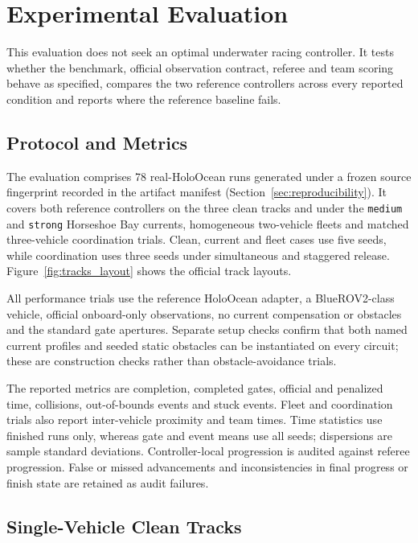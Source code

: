 \section{Experimental Evaluation}
\label{sec:evaluation}

This evaluation does not seek an optimal underwater racing controller. It tests whether the benchmark, official observation contract, referee and team scoring behave as specified, compares the two reference controllers across every reported condition and reports where the reference baseline fails.

\subsection{Protocol and Metrics}

The evaluation comprises 78 real-HoloOcean runs generated under a frozen source fingerprint recorded in the artifact manifest (Section~\ref{sec:reproducibility}). It covers both reference controllers on the three clean tracks and under the \texttt{medium} and \texttt{strong} Horseshoe Bay currents, homogeneous two-vehicle fleets and matched three-vehicle coordination trials. Clean, current and fleet cases use five seeds, while coordination uses three seeds under simultaneous and staggered release. Figure~\ref{fig:tracks_layout} shows the official track layouts.



All performance trials use the reference HoloOcean adapter, a BlueROV2-class vehicle, official onboard-only observations, no current compensation or obstacles and the standard gate apertures. Separate setup checks confirm that both named current profiles and seeded static obstacles can be instantiated on every circuit; these are construction checks rather than obstacle-avoidance trials.

The reported metrics are completion, completed gates, official and penalized time, collisions, out-of-bounds events and stuck events. Fleet and coordination trials also report inter-vehicle proximity and team times. Time statistics use finished runs only, whereas gate and event means use all seeds; dispersions are sample standard deviations. Controller-local progression is audited against referee progression. False or missed advancements and inconsistencies in final progress or finish state are retained as audit failures.

\subsection{Single-Vehicle Clean Tracks}
\label{sec:eval_clean}

